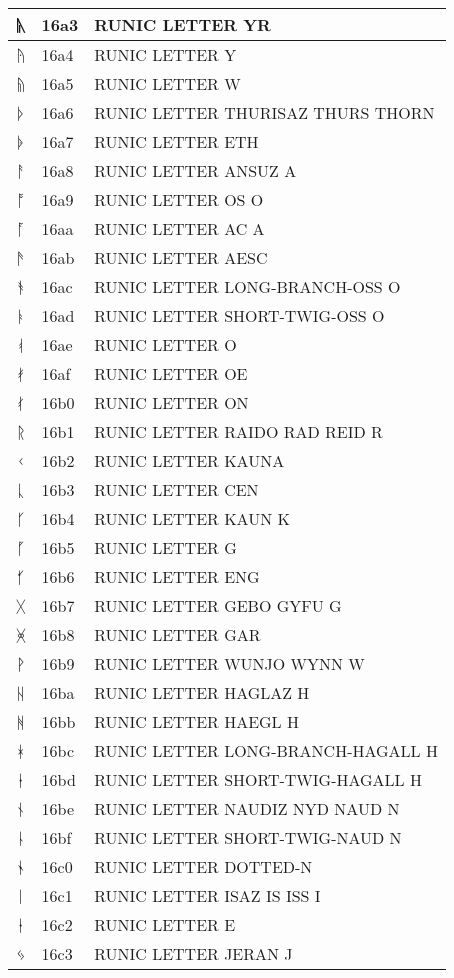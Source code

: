 \documentclass[12pt,letterpaper,openany]{book}
\begin{document}
\begin{center}
\begin{supertabular}{|m{0.25in}|m{0.5in}|m{4in}|}
ᚣ & 16a3 & RUNIC LETTER YR\\\hline
ᚤ & 16a4 & RUNIC LETTER Y\\\hline
ᚥ & 16a5 & RUNIC LETTER W\\\hline
ᚦ & 16a6 & RUNIC LETTER THURISAZ THURS THORN\\\hline
ᚧ & 16a7 & RUNIC LETTER ETH\\\hline
ᚨ & 16a8 & RUNIC LETTER ANSUZ A\\\hline
ᚩ & 16a9 & RUNIC LETTER OS O\\\hline
ᚪ & 16aa & RUNIC LETTER AC A\\\hline
ᚫ & 16ab & RUNIC LETTER AESC\\\hline
ᚬ & 16ac & RUNIC LETTER LONG-BRANCH-OSS O\\\hline
ᚭ & 16ad & RUNIC LETTER SHORT-TWIG-OSS O\\\hline
ᚮ & 16ae & RUNIC LETTER O\\\hline
ᚯ & 16af & RUNIC LETTER OE\\\hline
ᚰ & 16b0 & RUNIC LETTER ON\\\hline
ᚱ & 16b1 & RUNIC LETTER RAIDO RAD REID R\\\hline
ᚲ & 16b2 & RUNIC LETTER KAUNA\\\hline
ᚳ & 16b3 & RUNIC LETTER CEN\\\hline
ᚴ & 16b4 & RUNIC LETTER KAUN K\\\hline
ᚵ & 16b5 & RUNIC LETTER G\\\hline
ᚶ & 16b6 & RUNIC LETTER ENG\\\hline
ᚷ & 16b7 & RUNIC LETTER GEBO GYFU G\\\hline
ᚸ & 16b8 & RUNIC LETTER GAR\\\hline
ᚹ & 16b9 & RUNIC LETTER WUNJO WYNN W\\\hline
ᚺ & 16ba & RUNIC LETTER HAGLAZ H\\\hline
ᚻ & 16bb & RUNIC LETTER HAEGL H\\\hline
ᚼ & 16bc & RUNIC LETTER LONG-BRANCH-HAGALL H\\\hline
ᚽ & 16bd & RUNIC LETTER SHORT-TWIG-HAGALL H\\\hline
ᚾ & 16be & RUNIC LETTER NAUDIZ NYD NAUD N\\\hline
ᚿ & 16bf & RUNIC LETTER SHORT-TWIG-NAUD N\\\hline
ᛀ & 16c0 & RUNIC LETTER DOTTED-N\\\hline
ᛁ & 16c1 & RUNIC LETTER ISAZ IS ISS I\\\hline
ᛂ & 16c2 & RUNIC LETTER E\\\hline
ᛃ & 16c3 & RUNIC LETTER JERAN J\\\hline

\end{supertabular}
\end{center}
\end{document}
